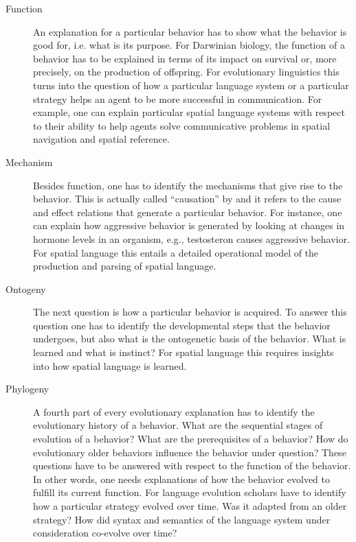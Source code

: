 \begin{description} 
\item[Function] An explanation for a particular behavior has to show what
the behavior is good for, i.e. what is its purpose. For Darwinian biology, 
the function of a behavior has to be explained in terms of its impact 
on survival or, more precisely, on the production of offspring. For evolutionary
linguistics this turns into the question of how a particular language system or a particular strategy
helps an agent to be more successful in communication. For example,
one can explain particular spatial language systems with respect to their ability
to help agents solve communicative problems in spatial navigation and 
spatial reference.

\item[Mechanism] Besides function, one has to identify the mechanisms that give rise 
to the behavior. 
This is actually called ``causation'' by \cite{tinbergen1963aims} 
and it refers to the cause and effect relations that generate a particular behavior. 
For instance, one can explain how aggressive behavior is generated by looking
at changes in hormone levels in an organism, e.g., testosteron causes aggressive behavior.
For spatial language this entails a detailed operational model of the 
production and parsing of spatial language.

\item[Ontogeny] The next question is how a particular behavior is acquired. To
answer this question one has to identify the developmental steps that
the behavior undergoes, but also what is the ontogenetic basis 
of the behavior. What is learned and what is instinct? For spatial language this 
requires insights into how spatial language is learned.

\item[Phylogeny] A fourth part of every evolutionary explanation has to
identify the evolutionary history of a behavior. What are
the sequential stages of evolution of a behavior? What are the prerequisites
of a behavior? How do evolutionary older behaviors influence 
the behavior under question? These questions have to be answered
with respect to the function of the behavior. In other words, one needs
explanations of how the behavior evolved to fulfill its current function. 
For language evolution scholars have to identify how a particular strategy 
evolved over time. Was it adapted from an older strategy? 
How did syntax and semantics of the language system under consideration co-evolve over time?
\end{description}

